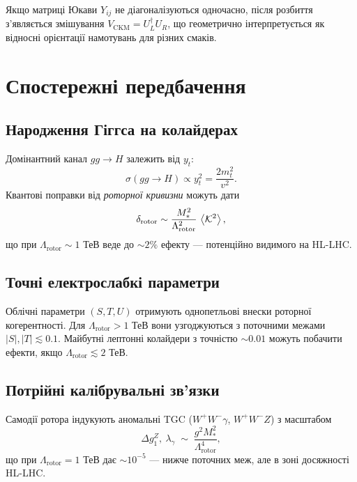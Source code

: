 \documentclass[11pt,a4paper]{article}
\theoremstyle{definition}
\theoremstyle{plain}
\theoremstyle{remark}
\begin{document}
Якщо матриці Юкави $Y_{ij}$ не діагоналізуються одночасно, після розбиття з’являється змішування $V_{\text{CKM}}=U_L^\dagger U_R$, що геометрично інтерпретується як відносні орієнтації намотувань для різних смаків.

\vspace{1em}

\section{Спостережні передбачення}\label{sec:predictions}

\subsection{Народження Гіггса на колайдерах}

Домінантний канал $gg\to H$ залежить від $y_t$:
\begin{equation}
  \sigma(gg \to H) \propto y_t^2 = \frac{2m_t^2}{v^2}.
\end{equation}
Квантові поправки від \emph{роторної кривизни} можуть дати
\begin{equation}
  \delta_{\text{rotor}} \sim \frac{M_\ast^2}{\Lambda_{\text{rotor}}^2}\,\ev{\mathcal{K}^2},
\end{equation}
що при $\Lambda_{\text{rotor}}\sim 1$ ТеВ веде до $\sim 2\%$ ефекту — потенційно видимого на HL-LHC.

\subsection{Точні електрослабкі параметри}

Облічні параметри $(S,T,U)$ отримують однопетльові внески роторної когерентності. Для $\Lambda_{\text{rotor}}>1$ ТеВ вони узгоджуються з поточними межами $|S|,|T|\lesssim 0{.}1$. Майбутні лептонні колайдери з точністю $\sim 0{.}01$ можуть побачити ефекти, якщо $\Lambda_{\text{rotor}}\lesssim 2$ ТеВ.

\subsection{Потрійні калібрувальні зв’язки}

Самодії ротора індукують аномальні TGC ($W^+W^-\gamma$, $W^+W^-Z$) з масштабом
\begin{equation}
  \Delta g_1^Z,\ \lambda_\gamma \;\sim\; \frac{g^2 M_\ast^2}{\Lambda_{\text{rotor}}^4},
\end{equation}
що при $\Lambda_{\text{rotor}}=1$ ТеВ дає $\sim 10^{-5}$ — нижче поточних меж, але в зоні досяжності HL-LHC.
\end{document}
